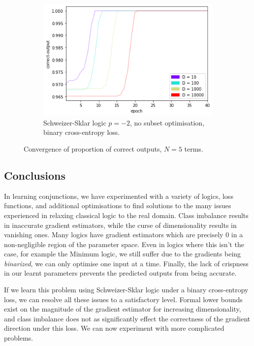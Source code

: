 \begin{figure}[h]
\begin{subfigure}[t]{0.30\textwidth}
        \includegraphics[width=\textwidth]{imgs/conj-co-ss-nokeepn-5t-bce.png}
        \caption{Schweizer-Sklar logic $p=-2$, no subset optimisation, binary cross-entropy loss.}
        \label{fig:conjconvcoss}
    \end{subfigure}
       \caption{Convergence of proportion of correct outputs, $N=5$ terms.}
       \label{fig:conjconvco}
\end{figure}

\subsection{Conclusions}

In learning conjunctions, we have experimented with a variety of logics, loss functions, and additional optimisations to find solutions to the many issues experienced in relaxing classical logic to the real domain. Class imbalance results in inaccurate gradient estimators, while the curse of dimensionality results in vanishing ones. Many logics have gradient estimators which are precisely 0 in a non-negligible region of the parameter space. Even in logics where this isn't the case, for example the Minimum logic, we still suffer due to the gradients being \textit{binarized}, we can only optimise one input at a time. Finally, the lack of crispness in our learnt parameters prevents the predicted outputs from being accurate.

If we learn this problem using Schweizer-Sklar logic under a binary cross-entropy loss, we can resolve all these issues to a satisfactory level. Formal lower bounds exist on the magnitude of the gradient estimator for increasing dimensionality, and class imbalance does not as significantly effect the correctness of the gradient direction under this loss. We can now experiment with more complicated problems. 

